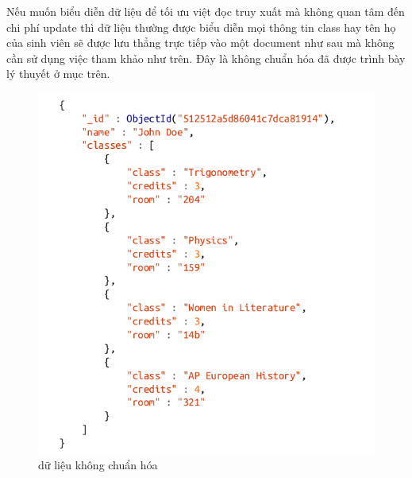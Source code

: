 Nếu muốn biểu diễn dữ liệu để tối ưu việt đọc truy xuất mà không quan tâm đến chi phí update thì dữ liệu thường được biểu diễn mọi thông tin class hay tên họ của sinh viên sẽ được lưu thẳng trực tiếp vào một document như sau mà không cần sử dụng việc tham khảo như trên. Đây là không chuẩn hóa đã được trình bày lý thuyết ở mục trên.
\begin{figure}[h!]
		\centering
		\includegraphics[scale=0.5]{charts/denor.png}
		\caption{dữ liệu không chuẩn hóa}
		\label{fig:datare3}
\end{figure}
